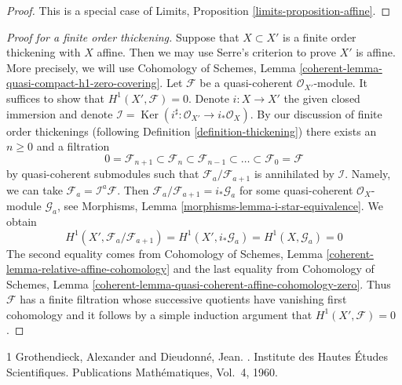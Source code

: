 \documentclass[10pt,a4paper]{amsart}
\theoremstyle{plain}
\theoremstyle{definition}
\theoremstyle{remark}
\numberwithin{equation}{subsection}
\def\Ker{\mathop{\mathrm{Ker}}}
\begin{document}
\begin{proof}
This is a special case of
Limits, Proposition \ref{limits-proposition-affine}.
\end{proof}

\begin{proof}[Proof for a finite order thickening]
Suppose that $X \subset X'$ is a finite order thickening with $X$ affine. Then
we may use Serre's criterion to prove $X'$ is affine. More precisely, we will
use Cohomology of Schemes, Lemma
\ref{coherent-lemma-quasi-compact-h1-zero-covering}. Let $\mathcal{F}$ be a
quasi-coherent $\mathcal{O}_{X'}$-module. It suffices to show that
$H^1(X', \mathcal{F}) = 0$. Denote $i : X \to X'$ the given closed immersion
and denote
$\mathcal{I} = \Ker(i^\sharp : \mathcal{O}_{X'} \to i_*\mathcal{O}_X)$.
By our discussion of finite order thickenings (following
Definition \ref{definition-thickening}) there exists an $n \geq 0$
and a filtration
$$
0 = \mathcal{F}_{n + 1} \subset \mathcal{F}_n \subset
\mathcal{F}_{n - 1} \subset \ldots \subset
\mathcal{F}_0 = \mathcal{F}
$$
by quasi-coherent submodules such that $\mathcal{F}_a/\mathcal{F}_{a + 1}$ is
annihilated by $\mathcal{I}$. Namely, we can take
$\mathcal{F}_a = \mathcal{I}^a\mathcal{F}$. Then
$\mathcal{F}_a/\mathcal{F}_{a + 1} = i_*\mathcal{G}_a$ for some quasi-coherent
$\mathcal{O}_X$-module $\mathcal{G}_a$, see Morphisms, Lemma
\ref{morphisms-lemma-i-star-equivalence}. We obtain
$$
H^1(X', \mathcal{F}_a/\mathcal{F}_{a + 1}) =
H^1(X', i_*\mathcal{G}_a) = H^1(X, \mathcal{G}_a) = 0
$$
The second equality comes from Cohomology of Schemes, Lemma
\ref{coherent-lemma-relative-affine-cohomology}
and the last equality from Cohomology of Schemes, Lemma
\ref{coherent-lemma-quasi-coherent-affine-cohomology-zero}.
Thus $\mathcal{F}$ has a finite filtration whose successive quotients
have vanishing first cohomology and it follows by a simple
induction argument that $H^1(X', \mathcal{F}) = 0$.
\end{proof}

\begin{thebibliography}{1}
Grothendieck, Alexander and Dieudonn{\'e}, Jean.
.
\newblock Institute des {H}autes {\'E}tudes {S}cientifiques.
\newblock Publications {M}ath{\'e}matiques, Vol.~4, 1960.
\end{thebibliography}
\end{document}
